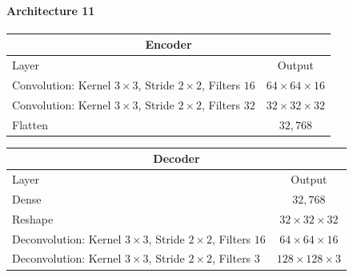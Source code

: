 \paragraph{Architecture 11}

\begin{center}
    \begin{table}[H]
        \centering
        \begin{tabular}{ | l | c | }
            \multicolumn{2}{c}{Encoder} \\ \hline
            Layer & Output\\ \hline
            Convolution: Kernel $3\times3$, Stride $2\times2$, Filters $16 $    & $64\times 64\times 16 $    \\  
            Convolution: Kernel $3\times3$, Stride $2\times2$, Filters $32 $    & $32\times 32\times 32 $    \\
            Flatten                                                             & $32,768$                   \\
            \hline
        \end{tabular} 
    \end{table}
\end{center}
\vspace{-4em}
\begin{center}
    \begin{table}[H]
        \centering
        \begin{tabular}{ | l | c | }
            \multicolumn{2}{c}{Decoder} \\ \hline
            Layer & Output\\ \hline
            Dense                                                                   & $32,768$                  \\
            Reshape                                                                 & $32\times 32\times  32 $  \\ 
            Deconvolution: Kernel $3\times3$, Stride $2\times2$, Filters $16 $      & $64\times 64\times  16 $  \\
            Deconvolution: Kernel $3\times3$, Stride $2\times2$, Filters $3  $      & $128\times 128\times3  $  \\
            \hline
        \end{tabular} 
    \end{table}
\end{center}

\vspace{-3em}

